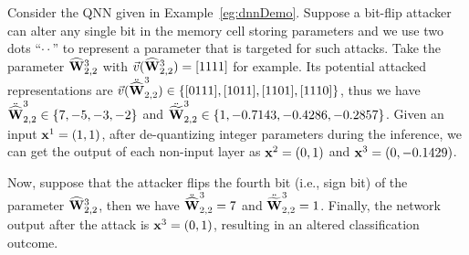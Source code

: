 \begin{example}
    Consider the QNN given in Example~\ref{eg:dnnDemo}. 
    Suppose a bit-flip attacker can alter any single bit in the memory cell storing parameters and we use two dots ``$\cdot\cdot$'' to represent a parameter that is targeted for such attacks.
    Take the parameter $\widehat{{\mathbf{W}}}^3_{2,2}$ with $\vec{v}(\widehat{{\mathbf{W}}}^3_{2,2})=[1111]$ for example. Its potential attacked representations are  $\vec{v}(\ddot{\widehat{{\mathbf{W}}}}^3_{2,2})\in\{[0111],[1011],[1101],[1110]\}$, thus we have $\ddot{\widehat{{\mathbf{W}}}}^3_{2,2}\in\{7,-5,-3,-2\}$ and $\ddot{\widetilde{{\mathbf{W}}}}^3_{2,2}\in\{1,-0.7143,-0.4286, -0.2857\}$. Given an input ${\mathbf{x}}^1=(1,1)$, after de-quantizing integer parameters during the inference, we can get the output of each non-input layer as ${\mathbf{x}}^2=(0,1)$ and ${\mathbf{x}}^3=(0,-0.1429)$.
    
    
    
    Now, suppose that the attacker flips the fourth bit (i.e., sign bit) of the parameter $\widehat{{\mathbf{W}}}^3_{2,2}$, 
    then we have $\ddot{\widehat{{\mathbf{W}}}}^3_{2,2}=7$ and $\ddot{\widetilde{{\mathbf{W}}}}^3_{2,2}=1$. Finally, the network output after the attack is ${\mathbf{x}}^3=(0,1)$, resulting in an altered classification outcome. %
\end{example}


